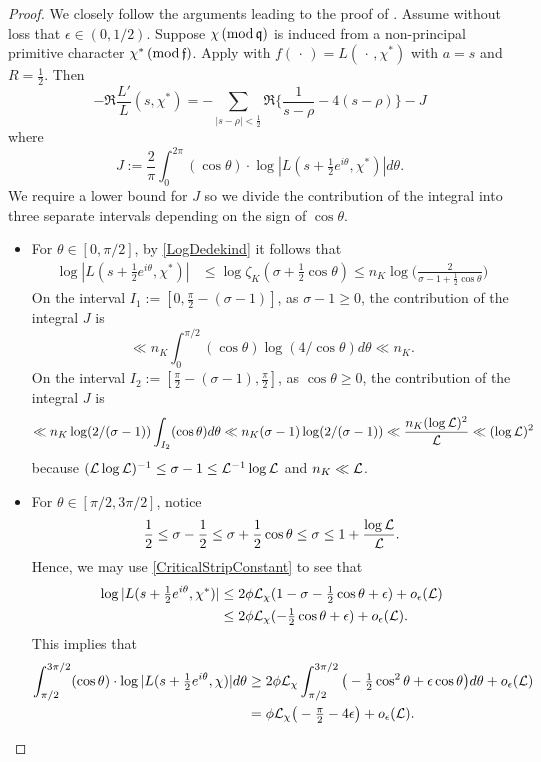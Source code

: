 \documentclass[12pt,psamsfonts]{amsart}
\theoremstyle{definition}
\theoremstyle{remark}
\numberwithin{equation}{section}
\begin{document}
\begin{proof} We closely follow the arguments leading to the proof of \cite[Lemma 3.1]{HBLinnik}. Assume without loss that $\epsilon \in (0,1/2)$. Suppose $\chi \, (\mathrm{mod} {\, \mathfrak{q}})$ is induced from a non-principal primitive character $\chi^* \, (\mathrm{mod} {\, \mathfrak{f}})$. Apply \cite[Lemma 3.2]{HBLinnik} with $f( \, \cdot \,) = L(\, \cdot \, ,\chi^*)$ with $a=s$ and $R = \tfrac{1}{2}$. Then
\begin{equation}
-\Re \frac{L'}{L}(s,\chi^*) = -\sum_{|s-\rho| < \frac{1}{2}} \Re\Big\{ \frac{1}{s-\rho} - 4(s-\rho) \Big\} - J
\label{JensenUse}
\end{equation}
where
\[
J := \frac{2}{\pi} \int_0^{2\pi} (\cos \theta) \cdot \log| L(s+\tfrac{1}{2} e^{i\theta},\chi^*)|d\theta.
\]
We require a lower bound for $J$ so we divide the contribution of the integral into three separate intervals depending on the sign of $\cos \theta$. 
\begin{itemize}
	\item For $\theta \in [0,\pi/2]$, by \cref{LogDedekind} it follows that
\begin{align*}
\log|L(s+\tfrac{1}{2}e^{i\theta},\chi^*)| 
&  \leq \log \zeta_K(\sigma+\tfrac{1}{2}\cos\theta)  \leq n_K \log \Big( \frac{2}{\sigma-1+\tfrac{1}{2}\cos\theta}\Big) 
\end{align*}
On the interval $I_1 := [0, \tfrac{\pi}{2} - (\sigma-1) ]$, as $\sigma-1 \geq 0$, the contribution of the integral $J$ is
\[
\ll  n_K  \int_0^{\pi/2} (\cos \theta) \log(4/\cos \theta) d\theta \ll n_K. 
\]
On the interval $I_2 := [\tfrac{\pi}{2} - (\sigma-1), \tfrac{\pi}{2}]$, as $\cos \theta \geq 0$, the contribution of the integral $J$ is
\[
\ll  n_K \log(2/(\sigma-1))  \int_{I_2} (\cos \theta) d\theta \ll n_K (\sigma-1) \log(2/(\sigma-1)) \ll \frac{n_K (\log \mathcal{L})^2}{\mathcal{L}}  \ll (\log \mathcal{L})^2
\]
because $(\mathcal{L}\log\mathcal{L})^{-1} \leq \sigma -1 \leq \mathcal{L}^{-1} \log \mathcal{L} $ and $n_K \ll \mathcal{L}$. 

\item For $\theta \in [\pi/2, 3\pi/2]$, notice
\[
\frac{1}{2} \leq \sigma-\frac{1}{2} \leq \sigma + \frac{1}{2}\cos\theta \leq \sigma \leq 1+\frac{\log \mathcal{L}}{\mathcal{L}}.
\]
Hence, we may use \cref{CriticalStripConstant} to see that
\begin{align*}
 \log|L(s+\tfrac{1}{2}e^{i\theta},\chi^*)| 
 & \leq 2\phi  \mathcal{L}_{\chi} (1-\sigma-\tfrac{1}{2}\cos\theta + \epsilon) + o_{\epsilon}(\mathcal{L})    \\
 & \leq 2\phi  \mathcal{L}_{\chi}(-\tfrac{1}{2}\cos\theta + \epsilon) + o_{\epsilon}(\mathcal{L}). 
\end{align*}
This implies that
\begin{align*}
  \int_{\pi/2}^{3\pi/2} (\cos \theta) \cdot \log|L(s+\tfrac{1}{2}e^{i\theta},\chi)|d\theta 
&  \geq 2\phi  \mathcal{L}_{\chi}   \int_{\pi/2}^{3\pi/2} \big(- \tfrac{1}{2}\cos^2 \theta + \epsilon \cos \theta \big) d\theta  + o_{\epsilon}(\mathcal{L}) \\
&  = \phi \mathcal{L}_{\chi} \big( -\tfrac{\pi}{2} -  4\epsilon \big) + o_{\epsilon}(\mathcal{L}).
\end{align*}


\end{itemize}
\end{proof}
\end{document}
